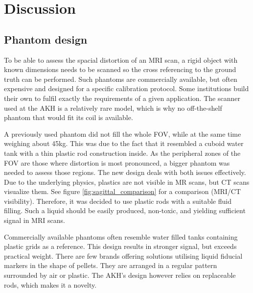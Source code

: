 


\chapter{Discussion}

\section{Phantom design}

To be able to assess the spacial distortion of an MRI scan, a rigid object with known dimensions needs to be scanned so the cross referencing to the ground truth can be performed.
Such phantoms are commercially available, but often expensive and designed for a specific calibration protocol.
Some institutions build their own to fulfil exactly the requirements of a given application.
The scanner used at the AKH is a relatively rare model, which is why no off-the-shelf phantom that would fit its coil is available.

A previously used phantom did not fill the whole FOV, while at the same time weighing about 45kg.
This was due to the fact that it resembled a cuboid water tank with a thin plastic rod construction inside.
As the peripheral zones of the FOV are those where distortion is most pronounced, a bigger phantom was needed to assess those regions.
The new design deals with both issues effectively.
Due to the underlying physics, plastics are not visible in MR scans, but CT scans visualize them. 
See figure \ref{fig:sagittal_comparison} for a comparison (MRI/CT visibility).
Therefore, it was decided to use plastic rods with a suitable fluid filling.
Such a liquid should be easily produced, non-toxic, and yielding sufficient signal in MRI scans.

Commercially available phantoms often resemble water filled tanks containing plastic grids as a reference.
This design results in stronger signal, but exceeds practical weight.
There are few brands offering solutions utilising liquid fiducial markers in the shape of pellets.
They are arranged in a regular pattern surrounded by air or plastic.
The AKH's design however relies on replaceable rods, which makes it a novelty.

